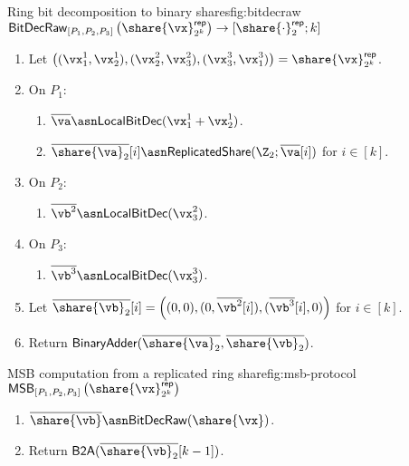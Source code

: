 

\begin{Boxfig}{Ring bit decomposition to binary shares}{fig:bitdecraw}
  {$\mathsf{BitDecRaw}_{[P_1, P_2, P_3]} \left( \share{\vx}^\mathsf{rep}_{2^k} \right) \rightarrow [\share{\cdot}^\mathsf{rep}_2; k]$}
  \begin{enumerate}
  \item Let $\left( (\vx_1^1, \vx_2^1), (\vx_2^2, \vx_3^2), (\vx_3^3, \vx_1^3) \right) = \share{\vx}^{\mathsf{rep}}_{2^k}$.

  \item On $P_1$:
  \begin{enumerate}
    \item $\overline{\va} \asn \textsf{LocalBitDec}(\vx^1_1 + \vx^1_2)$.
    \item $\overline{\share{\va}_2}[i] \asn \mathsf{ReplicatedShare}(\Z_2; \overline{\va}[i])$ for $i \in [k]$.
  \end{enumerate}

  \item On $P_2$:
  \begin{enumerate}
      \item $\overline{\vb^2} \asn \textsf{LocalBitDec}(\vx_3^2)$.
  \end{enumerate}

  \item On $P_3$:
  \begin{enumerate}
      \item $\overline{\vb^3} \asn \textsf{LocalBitDec}(\vx_3^3)$.
  \end{enumerate}
  \item Let $\overline{\share{\vb}_2}[i] = \left( (0, 0), (0, \overline{\vb^2}[i]), (\overline{\vb^3}[i], 0) \right)$ for $i \in [k]$.
  \item Return $\textsf{BinaryAdder}(\overline{\share{\va}_2}, \overline{\share{\vb}_2})$.
\end{enumerate}

\end{Boxfig}


\begin{Boxfig}{MSB computation from a replicated ring share}{fig:msb-protocol}
  {$\mathsf{MSB}_{[P_1, P_2, P_3]} \left( \share{\vx}^\mathsf{rep}_{2^k} \right)$}
  \begin{enumerate}
  \item $\overline{\share{\vb}} \asn \mathsf{BitDecRaw}(\share{\vx})$.
  \item Return $\textsf{B2A}(\overline{\share{\vb}_2}[k-1])$.
  \end{enumerate}

\end{Boxfig}

